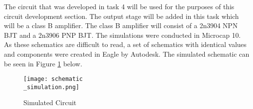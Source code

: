 


The circuit that was developed in task 4 will be used for the purposes of this circuit development section. The output stage will be added in this task which will be a class B amplifier. The class B amplifier will consist of a 2n3904 NPN BJT and a 2n3906 PNP BJT. The simulations were conducted in Microcap 10. As these schematics are difficult to read, a set of schematics with identical values and components were created in Eagle by Autodesk. The simulated schematic can be seen in Figure \ref{fig:simschem} below.

\begin{figure}[H]
	\centering
	\texttt{[image: schematic\\\_simulation.png]}
	\caption{Simulated Circuit}
	\label{fig:simschem}
\end{figure}




